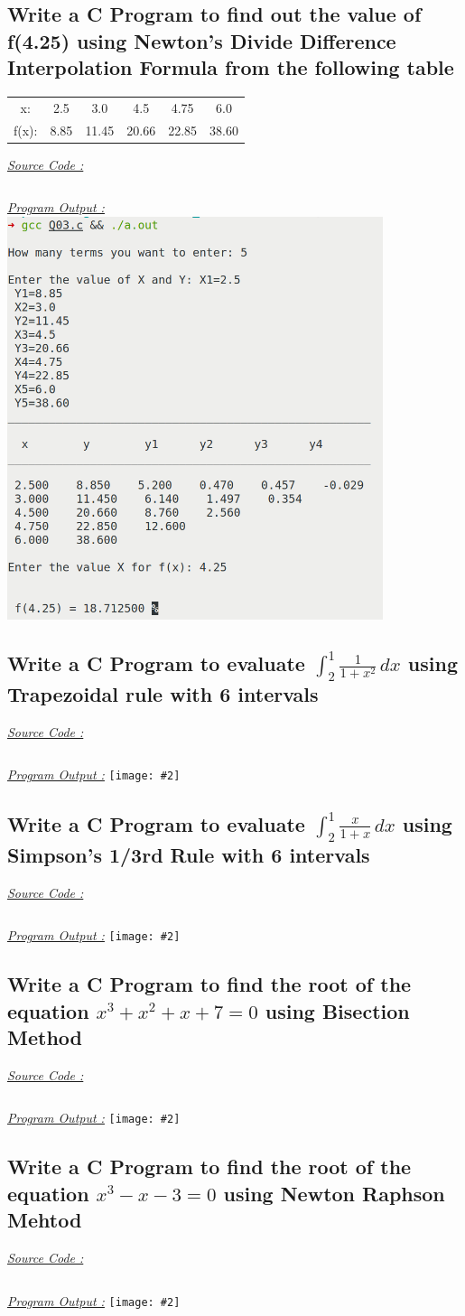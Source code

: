 \documentclass{report}
\newcommand{\subproblem}[3]{
  \subsection{#3}
    \underline{\emph{\Large Source Code :}}
    \inputminted[breaklines]{c}{#1.c}
    \bigbreak
    \noindent
    \underline{\emph{\Large Program Output :}}
    \bigbreak
    \noindent
    \texttt{[image: \#2]}
}
\begin{document}
\subsection{Write a C Program to find out the value of f(4.25) using Newton's Divide Difference Interpolation Formula from the following table}
\begin{center}
\begin{tabular}{c|c|c|c|c|c}
  x: & 2.5 & 3.0 & 4.5 & 4.75 & 6.0 \\
  f(x): & 8.85 & 11.45 & 20.66 & 22.85 & 38.60 
\end{tabular}
\end{center}
\bigbreak
\underline{\emph{\Large Source Code :}}
\inputminted[breaklines]{c}{../codes/Q03.c}
\bigbreak
\noindent
\newpage
\underline{\emph{\Large Program Output :}}
\bigbreak
\noindent
\includegraphics[width=110mm,scale=0.5]{../outputs/light/Q03.png}

\subproblem{../codes/Q04}{Q04}{Write a C Program to evaluate $\int_{2}^{1} \frac{1}{1+x^2} \,dx$ using Trapezoidal rule with 6 intervals}

\subproblem{../codes/Q05}{Q05}{Write a C Program to evaluate $\int_{2}^{1} \frac{x}{1+x} \,dx$ using Simpson's 1/3rd Rule with 6 intervals}

\subproblem{../codes/Q06}{Q06}{Write a C Program to find the root of the equation $x^3 + x^2 + x + 7 = 0$ using Bisection Method}

\subproblem{../codes/Q07}{Q07}{Write a C Program to find the root of the equation $x^3 - x -3 = 0$ using Newton Raphson Mehtod}
\end{document}
